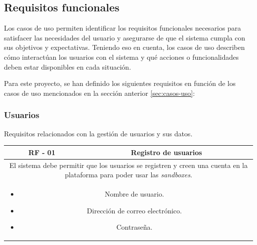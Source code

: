             \newpage
        
        
        \subsection{Requisitos funcionales}
            \label{sec:requisitos-funcionales}
            
            Los casos de uso permiten identificar los requisitos funcionales necesarios para satisfacer las necesidades del usuario y asegurarse de que el sistema cumpla con sus objetivos y expectativas. Teniendo eso en cuenta, los casos de uso describen cómo interactúan los usuarios con el sistema y qué acciones o funcionalidades deben estar disponibles en cada situación.
            
            Para este proyecto, se han definido los siguientes requisitos en función de los casos de uso mencionados en la sección anterior \ref{sec:casos-uso}:
            
            
            \subsubsection{Usuarios}
            
                Requisitos relacionados con la gestión de usuarios y sus datos.
                
                \begin{table}[!htbp]
                    \centering
                    \begin{tabular}{|c|c|}
                        \hline
                        \textbf{RF - 01} & \textbf{Registro de usuarios} \\
                        \hline
                        \multicolumn{2}{|p{15cm}|}{
                            El sistema debe permitir que los usuarios se registren y creen una cuenta en la plataforma para poder usar las \textit{sandboxes}.
                        } \\
                        \hline
                        \multicolumn{2}{|p{15cm}|}{
                            \begin{itemize}
                                \item Nombre de usuario.
                                \item Dirección de correo electrónico.
                                \item Contraseña.
                            \end{itemize}
                            } \\
                        \hline
                    \end{tabular}
                    \label{tab:RF1}
                \end{table}
                
